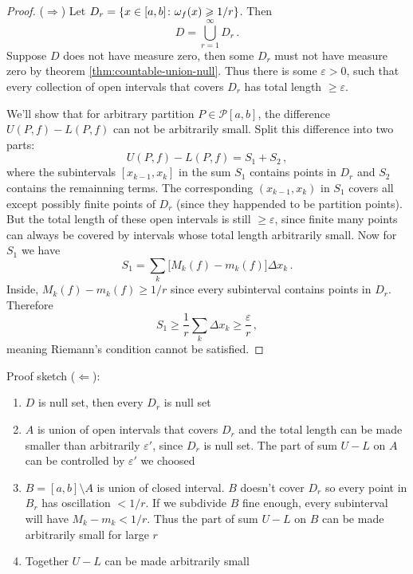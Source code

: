 \documentclass{article}
\newcommand{\Partition}{\mathcal P}
\DeclarePairedDelimiter\set{\lbrace}{\rbrace}
\begin{document}
\begin{proof}
    ($ \Rightarrow $)
    Let $ D_r = \set{x \in [a, b] \colon \omega_f (x) \geqslant 1/r } $. Then
    \[ 
         D = \bigcup_{r = 1}^\infty D_r \,.
    \]
    Suppose $ D $ does not have measure zero, then some $ D_r $ must not have measure zero by theorem \ref{thm:countable-union-null}. Thus there is some $ \varepsilon > 0 $, such that every collection of open intervals that covers $ D_r $ has total length $ \geqslant \varepsilon $.
    
    We'll show that for arbitrary partition $ P \in \Partition[a, b] $, the difference $ U(P, f) - L(P, f) $ can not be arbitrarily small. Split this difference into two parts:
    \[ 
        U(P, f) - L(P, f) = S_1 + S_2 \,,
    \]
    where the subintervals $ [x_{k-1}, x_k] $ in the sum $ S_1 $ contains points in $ D_r $ and $ S_2 $ contains the remainning terms. The corresponding $ (x_{k-1}, x_k) $ in $ S_1 $ covers all except possibly finite points of $ D_r $ (since they happended to be partition points). But the total length of these open intervals is still $ \geqslant \varepsilon $, since finite many points can always be covered by intervals whose total length arbitrarily small. Now for $ S_1 $ we have
    \[ 
        S_1 = \sum_{k} \big[ M_k (f) - m_k (f) \big] \Delta x_k \,.
    \]
    Inside, $ M_k (f) - m_k (f) \geqslant 1/r $ since every subinterval contains points in $ D_r $. Therefore
    \[ 
        S_1 \geqslant \dfrac{1}{r} \sum_k \Delta x_k \geqslant \dfrac{\varepsilon}{r} \,,
    \]
    meaning Riemann's condition cannot be satisfied.
\end{proof}

Proof sketch ($ \Leftarrow $): 
\begin{enumerate}
    \item $ D $ is null set, then every $ D_r $ is null set
    \item $ A $ is union of open intervals that covers $ D_r $ and the total length can be made smaller than arbitrarily $ \varepsilon' $, since $ D_r $ is null set. The part of sum $ U - L $ on $ A $ can be controlled by $ \varepsilon' $ we choosed
    \item $ B = [a, b] \setminus A $ is union of closed interval. $ B $ doesn't cover $ D_r $ so every point in $ B_r $ has oscillation $ < 1/r $. If we subdivide $ B $ fine enough, every subinterval will have $ M_k - m_k < 1/r $. Thus the part of sum $ U - L $ on $ B $ can be made arbitrarily small for large $ r $
    \item Together $ U - L $ can be made arbitrarily small
\end{enumerate}
\end{document}
